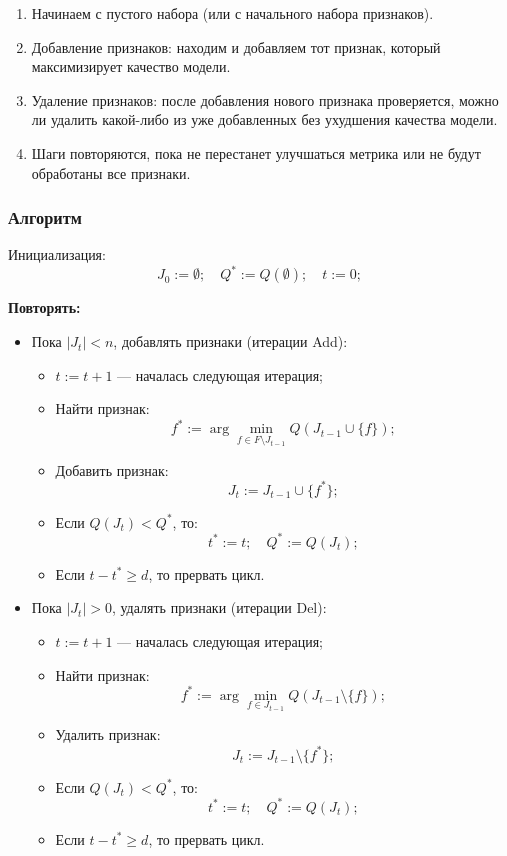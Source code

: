 \begin{enumerate}

\item Начинаем с пустого набора (или с начального набора признаков).

\item Добавление признаков: находим и добавляем тот признак, который максимизирует качество модели.

\item Удаление признаков: после добавления нового признака проверяется, можно ли удалить какой-либо из уже добавленных без ухудшения качества модели.

\item Шаги повторяются, пока не перестанет улучшаться метрика или не будут обработаны все признаки.

\end{enumerate}


\subsubsection*{Алгоритм}


Инициализация:
\[
J_0 := \emptyset; \quad Q^* := Q(\emptyset); \quad t := 0;
\]

\textbf{Повторять:}
\begin{itemize}
    \item Пока \( |J_t| < n \), добавлять признаки (итерации Add):
    \begin{itemize}
        \item \( t := t + 1 \) — началась следующая итерация;
        \item Найти признак:
        \[
        f^* := \arg \min_{f \in F \setminus J_{t-1}} Q(J_{t-1} \cup \{f\});
        \]
        \item Добавить признак:
        \[
        J_t := J_{t-1} \cup \{f^*\};
        \]
        \item Если \( Q(J_t) < Q^* \), то:
        \[
        t^* := t; \quad Q^* := Q(J_t);
        \]
        \item Если \( t - t^* \geq d \), то прервать цикл.
    \end{itemize}
    \item Пока \( |J_t| > 0 \), удалять признаки (итерации Del):
    \begin{itemize}
        \item \( t := t + 1 \) — началась следующая итерация;
        \item Найти признак:
        \[
        f^* := \arg \min_{f \in J_{t-1}} Q(J_{t-1} \setminus \{f\});
        \]
        \item Удалить признак:
        \[
        J_t := J_{t-1} \setminus \{f^*\};
        \]
        \item Если \( Q(J_t) < Q^* \), то:
        \[
        t^* := t; \quad Q^* := Q(J_t);
        \]
        \item Если \( t - t^* \geq d \), то прервать цикл.
    \end{itemize}
\end{itemize}

